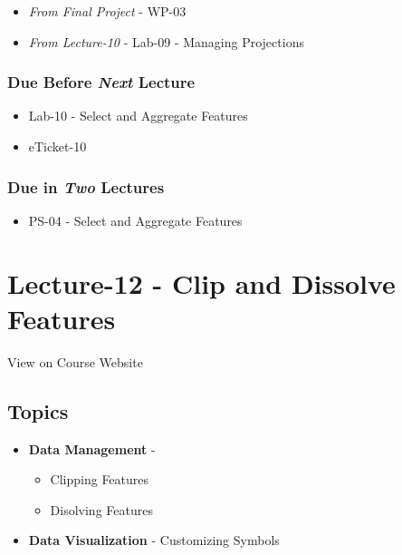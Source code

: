 \documentclass[
]{book}
\providecommand{\tightlist}{%
  \setlength{\itemsep}{0pt}\setlength{\parskip}{0pt}}
\begin{document}
\begin{itemize}
\tightlist
\item
  \emph{From Final Project} - WP-03
\item
  \emph{From Lecture-10} - Lab-09 - Managing Projections
\end{itemize}

\hypertarget{due-before-next-lecture-9}{%
\subsubsection*{\texorpdfstring{Due Before \emph{Next} Lecture}{Due Before Next Lecture}}\label{due-before-next-lecture-9}}

\begin{itemize}
\tightlist
\item
  Lab-10 - Select and Aggregate Features
\item
  eTicket-10
\end{itemize}

\hypertarget{due-in-two-lectures-5}{%
\subsubsection*{\texorpdfstring{Due in \emph{Two} Lectures}{Due in Two Lectures}}\label{due-in-two-lectures-5}}

\begin{itemize}
\tightlist
\item
  PS-04 - Select and Aggregate Features
\end{itemize}

\hypertarget{lecture-12---clip-and-dissolve-features}{%
\section*{Lecture-12 - Clip and Dissolve Features}\label{lecture-12---clip-and-dissolve-features}}

View on Course Website

\hypertarget{topics-12}{%
\subsection*{Topics}\label{topics-12}}

\begin{itemize}
\tightlist
\item
  \textbf{Data Management} -

  \begin{itemize}
  \tightlist
  \item
    Clipping Features
  \item
    Disolving Features
  \end{itemize}
\item
  \textbf{Data Visualization} - Customizing Symbols
\end{itemize}
\end{document}
